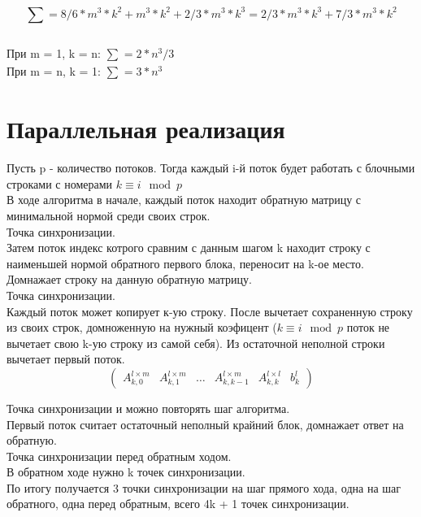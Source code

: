 \documentclass[12pt]{scrreprt}
\begin{document}
$$ \sum_{} = 8/6 * m^3 * k^2 + m^3 * k^2 + 2/3 * m^3 * k^3 = 2/3 * m^3 * k^3 + 7/3 * m^3 * k^2$$\\

При m = 1, k = n: $\sum_{} = 2*n^3/3$\\
При m = n, k = 1: $\sum_{} = 3*n^3$\\

\chapter{Параллельная реализация}
Пусть p - количество потоков. Тогда каждый i-й поток будет работать с блочными строками с номерами $k \equiv i \mod p $\\
В ходе алгоритма в начале, каждый поток находит обратную матрицу с минимальной нормой среди своих строк. \\

Точка синхронизации. \\

Затем поток индекс котрого сравним с данным шагом k находит строку с наименьшей нормой обратного первого блока, переносит на k-ое место. Домнажает строку на данную обратную матрицу. \\

Точка синхронизации.\\

Каждый поток может копирует к-ую строку. После вычетает сохраненную строку из своих строк, домноженную на нужный коэфицент ($k \equiv i \mod p $ поток не вычетает свою k-ую строку из самой себя). Из остаточной неполной строки вычетает первый поток.\\
\[ \left( \begin{matrix}
{A_{k,0}^{l \times m}} & {A_{k,1}^{l \times m}} & {\dots} & {A_{k, k-1}^{l \times m}} & {A_{k, k}^{l \times l}} & {b_{k}^{l}}
\end{matrix}\right) \]

Точка синхронизации и можно повторять шаг алгоритма.\\

Первый поток считает остаточный неполный крайний блок, домнажает ответ на обратную.\\

Точка синхронизации перед обратным ходом.\\

В обратном ходе нужно k точек синхронизации.\\

По итогу получается 3 точки синхронизации на шаг прямого хода, одна на шаг обратного, одна перед обратным, всего 4k + 1 точек синхронизации.\\
\end{document}
